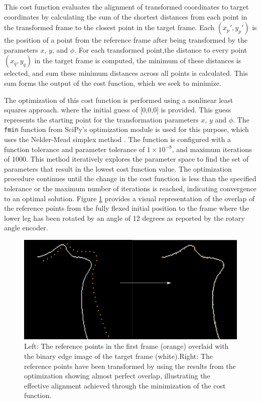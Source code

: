 \documentclass{micro-econ-thesis}
\begin{document}
This cost function evaluates the alignment of transformed coordinates to target coordinates by calculating the sum of the shortest distances from each point in the transformed frame to the closest point in the target frame. Each $(x_p', y_p')$ is the position of a point from the reference frame after being transformed by the parameters $x$, $y$, and $\phi$. For each transformed point,the distance to every point $(x_q, y_q)$ in the target frame is computed, the minimum of these distances is selected, and sum these minimum distances across all points is calculated. This sum forms the output of the cost function, which we seek to minimize.

The optimization of this cost function is performed using a nonlinear least squares approach. where the initial guess of [0,0,0] is provided. This guess represents the starting point for the transformation parameters $x$, $y$ and $\phi$. The \texttt{fmin} function from SciPy’s optimization module is used for this purpose, which uses the Nelder-Mead simplex method \parencite{nelder_simplex_1965}.   The function is configured with a function tolerance and parameter tolerance of $1 \times 10^{-8}$, and maximum iterations of 1000. This method iteratively explores the parameter space to find the set of parameters that result in the lowest cost function value. The optimization procedure continues until the change in the cost function is less than the specified tolerance or the maximum number of iterations is reached, indicating convergence to an optimal solution. Figure \ref{fig:edge_tracking} provides a visual representation of the overlap of the reference points from the fully flexed initial position to the frame where the lower leg has been rotated by an angle of 12 degrees as reported by the rotary angle encoder. 
\begin{figure}[H]
	\centering
	\includegraphics[width=0.7\linewidth]{image137}
	\caption{Left: The reference points in the first frame (orange) overlaid with the binary edge image of the target frame (white).Right: The reference points have been transformed by using the results from the optimization showing almost perfect overlap, illustrating the effective alignment achieved through the minimization of the cost function.}
	\label{fig:edge_tracking}
\end{figure}
\end{document}
